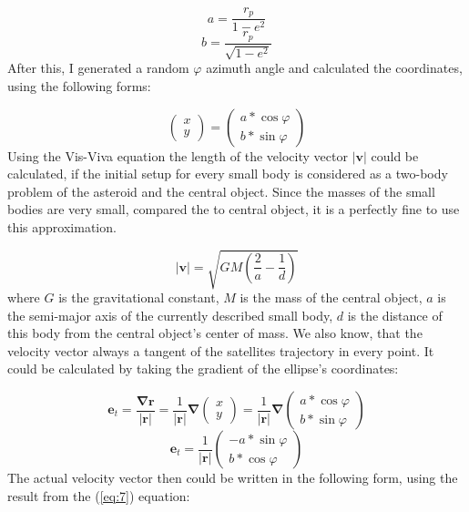 \begin{multicols}{2}
\begin{equation} \label{eq:4}
a = \frac{r_{p}}{1 - e^2}
\end{equation}
\begin{equation} \label{eq:5}
b = \frac{r_{p}}{\sqrt{1 - e^2}}
\end{equation}
After this, I generated a random $\varphi$ azimuth angle and calculated the coordinates, using the following forms:

\begin{equation} \label{eq:6}
\begin{pmatrix}
x \\
y
\end{pmatrix}
=
\begin{pmatrix}
a * \cos{\varphi} \\
b * \sin{\varphi}
\end{pmatrix}
\end{equation}
Using the Vis-Viva equation the length of the velocity vector $\left| \boldsymbol{v} \right|$ could be calculated, if the initial setup for every small body is considered as a two-body problem of the asteroid and the central object. Since the masses of the small bodies are very small, compared the to central object, it is a perfectly fine to use this approximation.

\begin{equation} \label{eq:7}
\left| \boldsymbol{v} \right|
=
\sqrt{GM \left( \frac{2}{a} - \frac{1}{d} \right)}
\end{equation}
where $G$ is the gravitational constant, $M$ is the mass of the central object, $a$ is the semi-major axis of the currently described small body, $d$ is the distance of this body from the central object's center of mass. We also know, that the velocity vector always a tangent of the satellites trajectory in every point. It could be calculated by taking the gradient of the ellipse's coordinates:

\begin{equation} \label{eq:8}
\boldsymbol{e}_{t}
=
\frac{\boldsymbol{\nabla} \boldsymbol{r}}{\left| \boldsymbol{r} \right|}
=
\frac{1}{\left| \boldsymbol{r} \right|}
\boldsymbol{\nabla}
\begin{pmatrix}
x \\
y
\end{pmatrix}
=
\frac{1}{\left| \boldsymbol{r} \right|}
\boldsymbol{\nabla}
\begin{pmatrix}
a * \cos{\varphi} \\
b * \sin{\varphi}
\end{pmatrix}
\end{equation}
\begin{equation} \label{eq:9}
\boldsymbol{e}_{t}
=
\frac{1}{\left| \boldsymbol{r} \right|}
\begin{pmatrix}
-a * \sin{\varphi} \\
b * \cos{\varphi}
\end{pmatrix}
\end{equation}
The actual velocity vector then could be written in the following form, using the result from the (\ref{eq:7}) equation:


\end{multicols}
